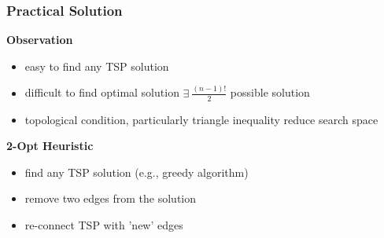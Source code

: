 \documentclass[10pt,handout,notes=show]{beamer}
\begin{document}
\begin{frame}
  \frametitle{Practical Solution}

  \textbf{Observation}
  \begin{itemize}
    \item easy to find \alert{any TSP solution}
    \item difficult to find \alert{optimal solution} $\exists\ \frac{(n-1)!}{2}$ possible solution
    \item topological condition, particularly \alert{triangle inequality} reduce search space \NextLine
  \end{itemize}

  \textbf{2-Opt Heuristic}
  \begin{itemize}
    \item find any TSP solution (e.g., greedy algorithm)
    \item remove \alert{two edges} from the solution
    \item re-connect TSP with 'new' edges
  \end{itemize}

\end{frame}

\end{document}
